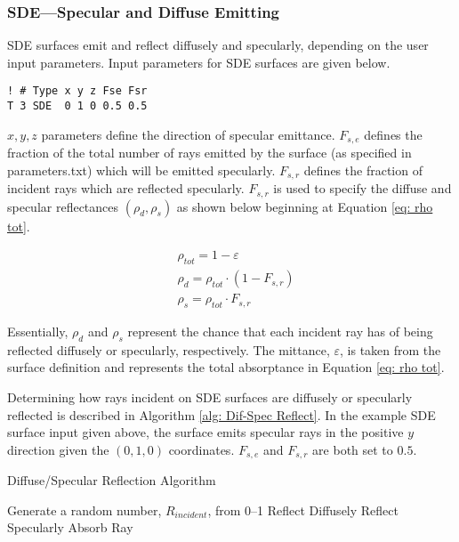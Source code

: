 \documentclass{article}
\begin{document}
\subsubsection{SDE---Specular and Diffuse Emitting}

SDE surfaces emit and reflect diffusely and specularly, depending on the user input parameters. Input parameters for SDE surfaces are given below.

\begin{lstlisting}
! # Type x y z Fse Fsr
T 3 SDE  0 1 0 0.5 0.5
\end{lstlisting}

$x, y, z$ parameters define the direction of specular emittance. $F_{s,e}$ defines the fraction of the total number of rays emitted by the surface (as specified in parameters.txt) which will be emitted specularly. $F_{s,r}$ defines the fraction of incident rays which are reflected specularly. $F_{s,r}$ is used to specify the diffuse and specular reflectances $(\rho_d, \rho_s)$ as shown below beginning at Equation \ref{eq: rho tot}.

\begin{align}
    \label{eq: rho tot}
    &\rho_{tot} = 1 - \varepsilon \\
    &\rho_d = \rho_{tot} \cdot (1 - F_{s,r}) \\
    &\rho_s = \rho_{tot} \cdot F_{s,r}
\end{align}

Essentially, $\rho_d$ and $\rho_s$ represent the chance that each incident ray has of being reflected diffusely or specularly, respectively. The mittance, $\varepsilon$, is taken from the surface definition and represents the total absorptance in Equation \ref{eq: rho tot}.

Determining how rays incident on SDE surfaces are diffusely or specularly reflected is described in Algorithm \ref{alg: Dif-Spec Reflect}. In the example SDE surface input given above, the surface emits specular rays in the positive $y$ direction given the $(0, 1, 0)$ coordinates. $F_{s,e}$ and $F_{s,r}$ are both set to $0.5$. 

\begin{algorithm}
\caption{Diffuse/Specular Reflection Algorithm}
\label{alg: Dif-Spec Reflect}
\begin{algorithmic}[1]
\State Generate a random number, $R_{incident}$, from 0--1
\State Reflect Diffusely
\State Reflect Specularly
\Else
\State Absorb Ray
\EndIf
\EndProcedure
\end{algorithmic}
\end{algorithm}
\end{document}
